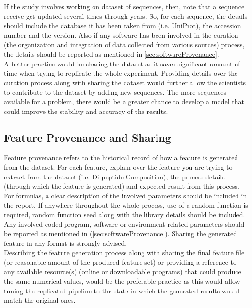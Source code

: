     If the study involves working on dataset of sequences, then, note that a sequence receive get updated several times through years. 
    So, for each sequence, the details should include the database it has been taken from (i.e. UniProt), 
    the accession number and the version. Also if any software has been involved in the curation
    (the organization and integration of data collected from various sources) process, 
    the details should be reported as mentioned in \ref{sec:softwareProvenance}.\\
    
    A better practice would be sharing the dataset as it saves significant amount of time when trying to replicate the whole experiment.
    Providing details over the curation process along with sharing the dataset would further allow the scientists to contribute to the 
    dataset by adding new sequences. The more sequences available for a problem, there would be a greater chance to develop a model 
    that could improve the stability and accuracy of the results.
    
\subsection{Feature Provenance and Sharing}
    Feature provenance refers to the historical record of how a feature is generated from the dataset. For each feature, explain 
    over the feature you are trying to extract from the dataset (i.e. Di-peptide Composition), the process details (through which the 
    feature is generated) and expected result from this process. For formulas, a clear description of the involved parameters should be 
    included in the report. If anywhere throughout the whole process, use of a random function is required, random function seed along 
    with the library details should be included. 
    Any involved coded program, software or environment related parameters should be reported as mentioned in 
    (\ref{sec:softwareProvenance}). Sharing the generated feature in any format is strongly advised.\\
    
    Describing the feature generation process along with sharing the final feature file (or reasonable amount of the 
    produced feature set) or providing a reference to any available resource(s) (online or downloadable programs) 
    that could produce the same numerical values, would be the preferable practice as this would allow tuning the replicated 
    pipeline to the state in which the generated results would match the original ones. \\
    
